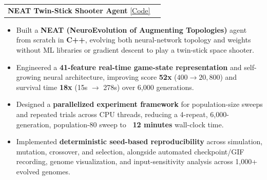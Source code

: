 \documentclass[letterpaper,11pt]{article}
\makeatletter
\newcommand{\resumeItem}[1]{%
  \item\small{#1}%
}
\newcommand{\resumeProjectHeading}[2]{
    \item
    \begin{tabular*}{0.97\textwidth}{l@{\extracolsep{\fill}}r}
      \small#1 & #2 \\
    \end{tabular*}\vspace{-7pt}
}
\newcommand{\resumeItemListStart}{%
  \begin{itemize}[itemsep=0pt, parsep=0pt, topsep=0pt, partopsep=0pt]
}
\newcommand{\resumeItemListEnd}{\end{itemize}\vspace{-5pt}}
\makeatother
\begin{document}

      \resumeProjectHeading
          {\textbf{NEAT Twin-Stick Shooter Agent} \href{https://github.com/nikhilCad/shooter-neuroevolution}{\underline{[Code]}}}{}
          \resumeItemListStart
            \resumeItem{Built a \textbf{NEAT (NeuroEvolution of Augmenting Topologies)} agent from scratch in \textbf{C++}, evolving both neural-network topology and weights without ML libraries or gradient descent to play a twin-stick space shooter.}
            \resumeItem{Engineered a \textbf{41-feature real-time game-state representation} and self-growing neural architecture, improving score \textbf{52x} ($400 \rightarrow 20,800$) and survival time \textbf{18x} (15s $\rightarrow$ 278s) over 6,000 generations.}            \resumeItem{Designed a \textbf{parallelized experiment framework} for population-size sweeps and repeated trials across CPU threads, reducing a 4-repeat, 6,000-generation, population-80 sweep to \textbf{~12 minutes} wall-clock time.}
            \resumeItem{Implemented \textbf{deterministic seed-based reproducibility} across simulation, mutation, crossover, and selection, alongside automated checkpoint/GIF recording, genome visualization, and input-sensitivity analysis across 1,000+ evolved genomes.}
          \resumeItemListEnd
\end{document}
